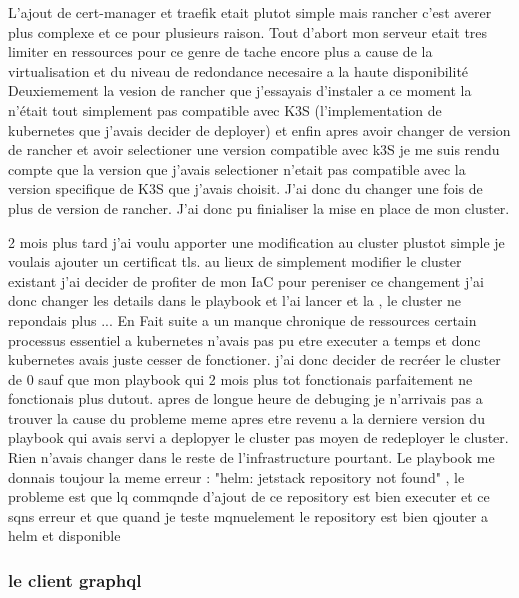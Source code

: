 L'ajout de cert-manager et traefik etait plutot simple mais rancher c'est averer plus complexe et ce pour plusieurs raison.
Tout d'abort mon serveur etait tres limiter en ressources pour ce genre de tache encore plus a cause de la virtualisation et du niveau de redondance necesaire a la haute disponibilité
Deuxiemement la vesion de rancher que j'essayais d'instaler a ce moment la n'était tout simplement pas compatible avec K3S (l'implementation de kubernetes que j'avais decider de deployer)
et enfin apres avoir changer de version de rancher et avoir selectioner une version compatible avec k3S je me suis rendu compte que la version que j'avais selectioner n'etait pas compatible avec la version specifique de K3S que j'avais choisit.
J'ai donc du changer une fois de plus de version de rancher.
J'ai donc pu finialiser la mise en place de mon cluster.

2 mois plus tard j'ai voulu apporter une modification au cluster plustot simple je voulais ajouter un certificat tls.
au lieux de simplement modifier le cluster existant j'ai decider de profiter de mon IaC pour pereniser ce changement j'ai donc changer les details dans le playbook et l'ai lancer
et la , le cluster ne repondais plus ...
En Fait suite a un manque chronique de ressources certain processus essentiel a kubernetes n'avais pas pu etre executer a temps et donc kubernetes avais juste cesser de fonctioner.
j'ai donc decider de recréer le cluster de 0 sauf que mon playbook qui 2 mois plus tot fonctionais parfaitement ne fonctionais plus dutout.
apres de longue heure de debuging je n'arrivais pas a trouver la cause du probleme meme apres etre
revenu a la derniere version du playbook qui avais servi a deplopyer le cluster pas moyen de redeployer le cluster.
Rien n'avais changer dans le reste de l'infrastructure pourtant.
Le playbook me donnais toujour la meme erreur : "helm: jetstack repository not found" , le probleme est que lq commqnde d'ajout de ce repository est bien executer et ce sqns erreur et que quand je teste mqnuelement le repository est bien qjouter a helm et disponible



\subsubsection{le client graphql}
